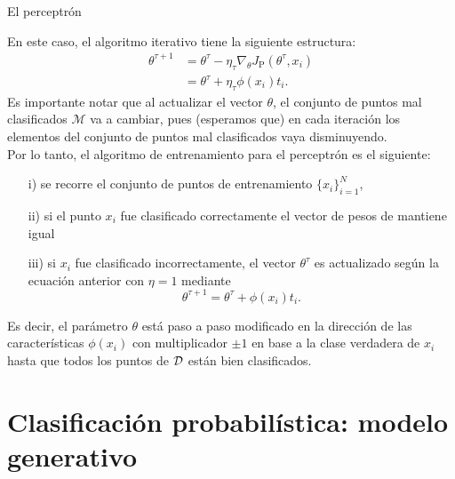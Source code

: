 \documentclass[9pt]{beamer}
\begin{document}
\begin{frame}{El perceptrón}

En este caso, el algoritmo iterativo tiene la siguiente estructura: \pause
\begin{align*}
  \theta^{\tau+1} &= \theta^\tau - \eta_\tau \nabla_\theta J_\text{P}(\theta^\tau,x_i)\nonumber\\
  &= \theta^\tau + \eta_\tau \phi(x_i)t_i.\label{eq:percetron_rule}
\end{align*}\pause
Es importante notar que al actualizar el vector $\theta$, el conjunto de puntos mal clasificados $\mathcal{M}$ va a cambiar, pues (esperamos que) en cada iteración los elementos del conjunto de puntos mal clasificados vaya disminuyendo.\\

Por lo tanto, el algoritmo de entrenamiento para el perceptrón es el siguiente: \pause

\begin{itemize}
  \item[i)] se recorre el conjunto de puntos de entrenamiento $\{x_i\}_{i=1}^N$, \pause
  \item[ii)] si el punto $x_i$ fue clasificado correctamente el vector de pesos de mantiene igual \pause
  \item[iii)] si $x_i$ fue clasificado incorrectamente, el vector $\theta^\tau$ es actualizado según la ecuación anterior con $\eta=1$ mediante
  \begin{equation*}
   \theta^{\tau+1} = \theta^\tau + \phi(x_i)t_i.
  \end{equation*} 
\end{itemize}
\pause
Es decir, el parámetro $\theta$ está paso a paso modificado en la dirección de las características $\phi(x_i)$ con multiplicador $\pm1$ en base a la clase verdadera de $x_i$ hasta  que todos los puntos de ${\mathcal D}$ están bien clasificados.


\end{frame}
\section{Clasificación probabilística: modelo generativo}
\end{document}
